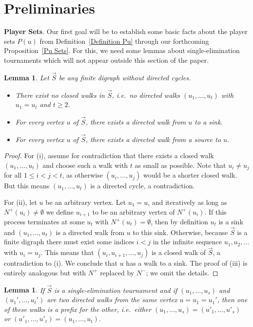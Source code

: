 \documentclass[12pt,letterpaper]{article}
\newtheorem{lem}[thm]{Lemma}
\theoremstyle{definition}
\renewcommand{\1}{\mathbbm{1}}
\newcommand{\tour}{\vec{S}}
\begin{document}
\section{Preliminaries}\label{sec:preliminaries}
\textbf{Player Sets}.  Our first goal will be to establish some basic facts about the player sets $P(u)$ from Definition~\ref{Definition Pu} through our forthcoming Proposition~\ref{Pu Sets}. For this, we need some lemmas about single-elimination tournaments which will not appear outside this section of the paper.

\begin{lem}\label{sources and sinks}
	Let $\tour$ be any finite digraph without directed cycles.
	\begin{itemize}
		\item[(i)] There exist no closed walks in $\tour$, i.e.\ no directed walks $(u_1,\ldots,u_t)$ with $u_1=u_t$ and $t\ge 2$.
		\item[(ii)] For every vertex $u$ of $\tour$, there exists a directed walk from $u$ to a sink.
		\item[(iii)] For every vertex $u$ of $\tour$, there exists a directed walk from a source to $u$.
	\end{itemize}
\end{lem}
\begin{proof}
	For (i), assume for contradiction that there exists a closed walk $(u_1,\ldots,u_t)$ and choose such a walk with $t$ as small as possible.  Note that $u_i\ne u_j$ for all $1\le i<j<t$, as otherwise $(u_i,\ldots,u_j)$ would be a shorter closed walk.  But this means $(u_1,\ldots,u_t)$ is a directed cycle, a contradiction.
	
	For (ii), let $u$ be an arbitrary vertex.  Let $u_1=u$, and iteratively as long as $N^+(u_i)\ne \emptyset$ we define $u_{i+1}$ to be an arbitrary vertex of $N^+(u_i)$.  If this process terminates at some $u_t$ with $N^+(u_t)=\emptyset$, then by definition $u_t$ is a sink and $(u_1,\ldots,u_t)$ is a directed walk from $u$ to this sink.  Otherwise, because $\tour$ is a finite digraph there must exist some indices $i<j$ in the infinite sequence $u_1,u_2,\ldots$ with $u_i=u_j$.  This means that $(u_i,u_{i+1},\ldots,u_j)$ is a closed walk of $\tour$, a contradiction to (i).  We conclude that $u$ has a walk to a sink.  The proof of (iii) is entirely analogous but with $N^+$ replaced by $N^-$; we omit the details.
\end{proof}
\begin{lem}\label{prefix path}
	If $\tour$ is a single-elimination tournament and if $(u_1,\ldots,u_s)$ and $(u_1',\ldots,u_t')$ are two directed walks from the same vertex $u=u_1=u_1'$, then one of these walks is a prefix for the other, i.e.\ either $(u_1,\ldots,u_s)=(u'_1,\ldots,u'_s)$ or $(u'_1,\ldots,u'_t)=(u_1,\ldots,u_t)$.
\end{lem}
\end{document}
